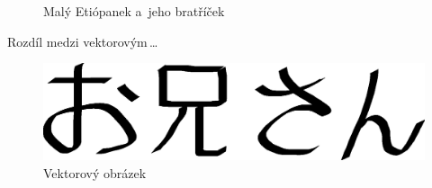 \documentclass[a4paper, 11pt]{article}
\begin{document}
\begin{figure}[htb]
{      
    }
    \caption{Malý Etiópanek a~jeho bratříček}
    \label{figure:etiopanek}
  \end{figure}

  \pagebreak

  Rozdíl medzi vektorovým\,\dots
  \begin{figure}[htb]
    \centering
    \includegraphics[scale=0.4]{oniisan}
    \caption{Vektorový obrázek}
    \label{figure:vektor}
  \end{figure}
\end{document}
